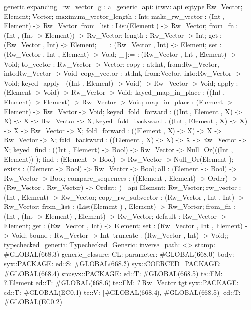 generic expanding_rw_vector_g
:
a_generic_api:
(rwv:
api {
    eqtype Rw_Vector;
    Element;
    Vector;
    maximum_vector_length : Int;
    make_rw_vector : (Int , Element) -> Rw_Vector;
    from_list : List(Element ) -> Rw_Vector;
    from_fn : (Int , (Int -> Element)) -> Rw_Vector;
    length : Rw_Vector -> Int;
    get : (Rw_Vector , Int) -> Element;
    _[] : (Rw_Vector , Int) -> Element;
    set : (Rw_Vector , Int , Element) -> Void;
    _[]:= : (Rw_Vector , Int , Element) -> Void;
    to_vector : Rw_Vector -> Vector;
    copy : {at:Int, from:Rw_Vector, into:Rw_Vector} -> Void;
    copy_vector : {at:Int, from:Vector, into:Rw_Vector} -> Void;
    keyed_apply : ((Int , Element) -> Void) -> Rw_Vector -> Void;
    apply : (Element -> Void) -> Rw_Vector -> Void;
    keyed_map_in_place : ((Int , Element) -> Element) -> Rw_Vector -> Void;
    map_in_place : (Element -> Element) -> Rw_Vector -> Void;
    keyed_fold_forward : ((Int , Element , X) -> X) -> X -> Rw_Vector -> X;
    keyed_fold_backward : ((Int , Element , X) -> X) -> X -> Rw_Vector -> X;
    fold_forward : ((Element , X) -> X) -> X -> Rw_Vector -> X;
    fold_backward : ((Element , X) -> X) -> X -> Rw_Vector -> X;
    keyed_find : ((Int , Element) -> Bool) -> Rw_Vector -> Null_Or(((Int , Element)) );
    find : (Element -> Bool) -> Rw_Vector -> Null_Or(Element );
    exists : (Element -> Bool) -> Rw_Vector -> Bool;
    all : (Element -> Bool) -> Rw_Vector -> Bool;
    compare_sequences : ((Element , Element) -> Order) -> (Rw_Vector , Rw_Vector) -> Order;};
)
:
api {
    Element;
    Rw_Vector;
    rw_vector : (Int , Element) -> Rw_Vector;
    copy_rw_subvector : (Rw_Vector , Int , Int) -> Rw_Vector;
    from_list : (List(Element ) , Element) -> Rw_Vector;
    from_fn : (Int , (Int -> Element) , Element) -> Rw_Vector;
    default : Rw_Vector -> Element;
    get : (Rw_Vector , Int) -> Element;
    set : (Rw_Vector , Int , Element) -> Void;
    bound : Rw_Vector -> Int;
    truncate : (Rw_Vector , Int) -> Void;};
typechecked_generic:
Typechecked_Generic:
inverse_path: <>
stamp: #GLOBAL(668.3)
generic_closure:
CL:
parameter: #GLOBAL(668.0)
body: syx::PACKAGE:
        ed::S: #GLOBAL(668.2)
            syx::COERCED_PACKAGE:
                #GLOBAL(668.4)
                 src:syx::PACKAGE:
                        ed::T: #GLOBAL(668.5) te::FM: ?.Element
                        ed::T: #GLOBAL(668.6) te::FM: ?.Rw_Vector
                tgt:syx::PACKAGE:
                    ed::T: #GLOBAL(EC0.1)
                     te::V:
                     [#GLOBAL(668.4), #GLOBAL(668.5)]
                    ed::T: #GLOBAL(EC0.2)
